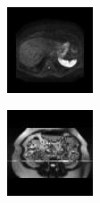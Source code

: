 \begin{figure}[htbp]
        \begin{subfigure}[b]{0.25\textwidth}
                \centering
                \includegraphics[width=.95\linewidth]{img_hyperopt/Abdomen_785}
        \end{subfigure}%
        \begin{subfigure}[b]{0.25\textwidth}
                \centering
                \includegraphics[width=.95\linewidth]{img_hyperopt/Abdomen_1050}

\end{subfigure}
\end{figure}
